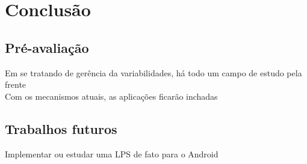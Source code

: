 \chapter{Conclusão}

\section{Pré-avaliação}
Em se tratando de gerência da variabilidades, há todo um campo de estudo pela 
frente \\
Com os mecanismos atuais, as aplicações ficarão inchadas

\section{Trabalhos futuros}
 Implementar ou estudar uma LPS de fato para o Android 

